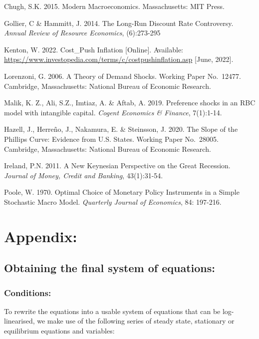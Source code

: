 \documentclass[11pt,preprint, authoryear]{elsarticle}
\numberwithin{equation}{section}
\numberwithin{figure}{section}
\numberwithin{table}{section}
\begin{document}
Chugh, S.K. 2015. Modern Macroeconomics. Massachusetts: MIT Press.

Gollier, C \& Hammitt, J. 2014. The Long-Run Discount Rate Controversy.
\emph{Annual Review of Resource Economics}, (6):273-295

Kenton, W. 2022. Cost\_Push Inflation {[}Online{]}. Available:
\url{https://www.investopedia.com/terms/c/costpushinflation.asp}
{[}June, 2022{]}.

Lorenzoni, G. 2006. A Theory of Demand Shocks. Working Paper No.~12477.
Cambridge, Massachusetts: National Bureau of Economic Research.

Malik, K. Z., Ali, S.Z., Imtiaz, A. \& Aftab, A. 2019. Preference shocks
in an RBC model with intangible capital. \emph{Cogent Economics \&
Finance}, 7(1):1-14.

Hazell, J., Herreño, J., Nakamura, E. \& Steinsson, J. 2020. The Slope
of the Phillips Curve: Evidence from U.S. States. Working Paper
No.~28005. Cambridge, Massachusetts: National Bureau of Economic
Research.

Ireland, P.N. 2011. A New Keynesian Perspective on the Great Recession.
\emph{Journal of Money, Credit and Banking}, 43(1):31-54.

Poole, W. 1970. Optimal Choice of Monetary Policy Instruments in a
Simple Stochastic Macro Model. \emph{Quarterly Journal of Economics},
84: 197-216.

\newpage

\hypertarget{appendix}{%
\section{Appendix:}\label{appendix}}

\hypertarget{obtaining-the-final-system-of-equations}{%
\subsection{Obtaining the final system of
equations:}\label{obtaining-the-final-system-of-equations}}

\hypertarget{conditions}{%
\subsubsection{Conditions:}\label{conditions}}

To rewrite the equations into a usable system of equations that can be
log-linearised, we make use of the following series of steady state,
stationary or equilibrium equations and variables:
\end{document}
